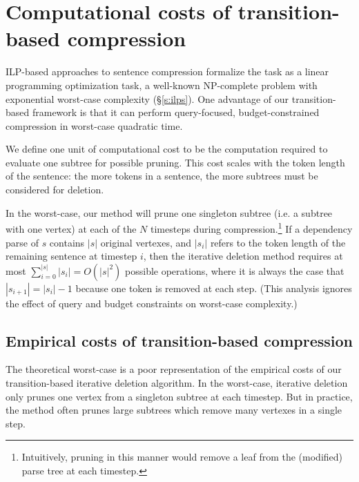 \documentclass[11pt,a4paper]{article}
\begin{document}
\section{Computational costs of transition-based compression}\label{s:costs}

ILP-based approaches to sentence compression formalize the task as a linear programming optimization task, a well-known NP-complete problem with exponential worst-case complexity (\S\ref{s:ilps}). One advantage of our transition-based framework is that it can perform query-focused, budget-constrained compression in worst-case quadratic time. 

We define one unit of computational cost to be the computation required to evaluate one subtree for possible pruning. This cost scales with the token length of the sentence: the more tokens in a sentence, the more subtrees must be considered for deletion.  %

In the worst-case, our method will prune one singleton subtree (i.e. a subtree with one vertex) at each of the $N$ timesteps during compression.\footnote{Intuitively, pruning in this manner would remove a leaf from the (modified) parse tree at each timestep.} If a dependency parse of $s$ contains $|s|$ original vertexes, and $|s_i|$ refers to the token length of the remaining sentence at timestep $i$, then the iterative deletion method requires at most ${\sum_{i = 0}^{|s|} |s_i | = O(|s|^2)}$ possible operations, where it is always the case that $|s_{i + 1}| = |s_{i}|  - 1$ because one token is removed at each step. (This analysis ignores the effect of query and budget constraints on worst-case complexity.)

\subsection{Empirical costs of transition-based compression}\label{s:empiricalcost}

The theoretical worst-case is a poor representation of the empirical costs of our transition-based iterative deletion algorithm. In the worst-case, iterative deletion only prunes one vertex from a singleton subtree at each timestep. But in practice, the method often prunes large subtrees which remove many vertexes in a single step. 

\end{document}
